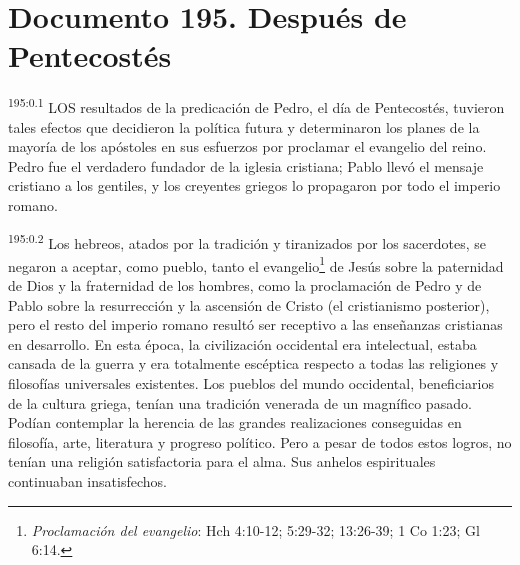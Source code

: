 \chapter{Documento 195. Después de Pentecostés}
\par
\textsuperscript{195:0.1} LOS resultados de la predicación de Pedro, el día de Pentecostés, tuvieron tales efectos que decidieron la política futura y determinaron los planes de la mayoría de los apóstoles en sus esfuerzos por proclamar el evangelio del reino. Pedro fue el verdadero fundador de la iglesia cristiana; Pablo llevó el mensaje cristiano a los gentiles, y los creyentes griegos lo propagaron por todo el imperio romano.

\par
\textsuperscript{195:0.2} Los hebreos, atados por la tradición y tiranizados por los sacerdotes, se negaron a aceptar, como pueblo, tanto el evangelio\footnote{\textit{Proclamación del evangelio}: Hch 4:10-12; 5:29-32; 13:26-39; 1 Co 1:23; Gl 6:14.} de Jesús sobre la paternidad de Dios y la fraternidad de los hombres, como la proclamación de Pedro y de Pablo sobre la resurrección y la ascensión de Cristo (el cristianismo posterior), pero el resto del imperio romano resultó ser receptivo a las enseñanzas cristianas en desarrollo. En esta época, la civilización occidental era intelectual, estaba cansada de la guerra y era totalmente escéptica respecto a todas las religiones y filosofías universales existentes. Los pueblos del mundo occidental, beneficiarios de la cultura griega, tenían una tradición venerada de un magnífico pasado. Podían contemplar la herencia de las grandes realizaciones conseguidas en filosofía, arte, literatura y progreso político. Pero a pesar de todos estos logros, no tenían una religión satisfactoria para el alma. Sus anhelos espirituales continuaban insatisfechos.

